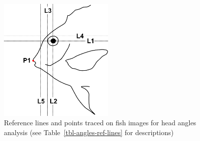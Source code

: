 \documentclass[
  letterpaper,
]{scrbook}
\begin{document}
\begin{figure}

{\centering \includegraphics[width=0.5\textwidth,height=\textheight]{./images/drawings/head_ref_lines_sketch.png}

}

\caption{\label{fig-angles-ref-lines}Reference lines and points traced
on fish images for head angles analysis (see
Table~\ref{tbl-angles-ref-lines} for descriptions)}

\end{figure}
\end{document}
